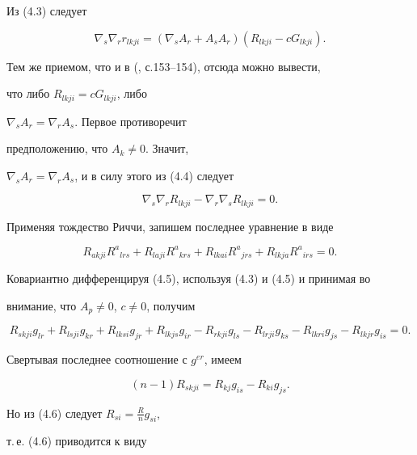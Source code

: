 Из (4.3) следует


\begin{equation}


\nabla_s\nabla_r r_{lkji}=(\nabla_s A_r+A_s A_r)


(R_{lkji}-cG_{lkji}).\tag{4.4}


\end{equation}


Тем же приемом, что и в (\cite{11}, с.153--154), отсюда можно вывести,


что либо $R_{lkji}=cG_{lkji}$, либо


$\nabla_s A_r=\nabla_r A_s$. Первое противоречит


предположению, что $A_k\ne 0$. Значит,


$\nabla_s A_r=\nabla_r A_s$, и в силу этого из (4.4) следует


$$


\nabla_s\nabla_r R_{lkji}-\nabla_r\nabla_s R_{lkji}=0.


$$


Применяя тождество Риччи, запишем последнее уравнение в виде


\begin{equation}


R_{akji}R^a{}_{lrs}+R_{laji}R^a{}_{krs}+


R_{lkai}R^a{}_{jrs}+R_{lkja}R^a{}_{irs}=0.\tag{4.5}


\end{equation}


Ковариантно дифференцируя (4.5), используя (4.3) и (4.5) и принимая во


внимание, что $A_p\ne 0$, $c\ne 0$, получим


$$


R_{skji}g_{lr}+R_{lsji}g_{kr}+R_{lksi}g_{jr}


+R_{lkjs}g_{ir}-R_{rkji}g_{ls}-R_{lrji}g_{ks}-


R_{lkri}g_{js}-R_{lkjr}g_{is}=0.


$$


Свертывая последнее соотношение с $g^{er}$, имеем


\begin{equation}


(n-1)R_{skji}=R_{kj}g_{is}-R_{ki}g_{js}.\tag{4.6}


\end{equation}


Но из (4.6) следует $R_{si}=\frac{R}{n}g_{si}$,


т.\,е. (4.6) приводится к виду


